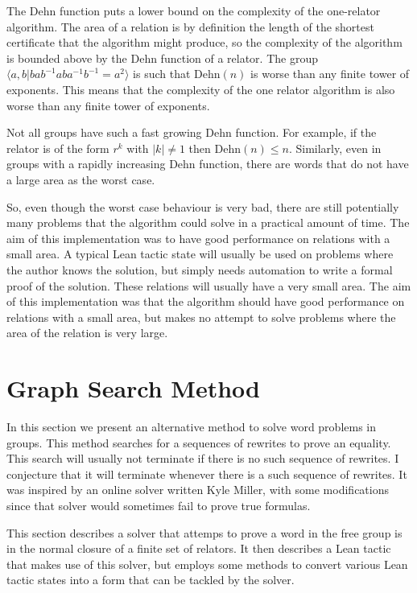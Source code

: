 \documentclass[12pt]{article} %
\theoremstyle{definition}
\theoremstyle{definition}
\theoremstyle{definition}
\theoremstyle{definition}
\theoremstyle{definition}
\theoremstyle{definition}
\begin{document}
  The Dehn function puts a lower bound on the complexity of the one-relator algorithm.
  The area of a relation is by definition the length of the shortest certificate
  that the algorithm might produce, so the complexity of the algorithm is bounded above by
  the Dehn function of a relator.
  The group $\langle a, b | b a b^{-1} a b a^{-1} b^{-1} = a^2\rangle$ is such that
  $\text{Dehn}(n)$ is worse than any finite tower of exponents. This means that the
  complexity of the one relator algorithm is also worse than any finite tower of
  exponents.

  Not all groups have such a fast growing Dehn function. For example, if the relator
  is of the form $r^k$ with $|k| \ne 1$ then $\text{Dehn}(n) \le n$.
  Similarly, even in groups with a rapidly increasing Dehn function,
  there are words that do not have a large area as the worst case.

  So, even though the worst case behaviour is very bad, there are still potentially many
  problems that the algorithm could solve in a practical amount of time. The aim of this
  implementation was to have good performance on relations with a small area.
  A typical Lean tactic state will usually be used on problems where the author knows
  the solution, but simply needs automation to write a formal proof of the solution.
  These relations will usually have a very small area. The aim of this implementation
  was that the algorithm should have good performance on relations with a small area,
  but makes no attempt to solve problems where the area of the relation is very large.

\section{Graph Search Method}\label{gsmethod}

  In this section we present an alternative method to solve word problems in groups.
  This method searches for a sequences of rewrites to prove an equality. This search will
  usually not terminate if there is no such sequence of rewrites. I conjecture that it
  will terminate whenever there is a such sequence of rewrites. It was inspired by an
  online solver written Kyle Miller, with some modifications since that solver
  would sometimes fail to prove true formulas.

  This section describes a solver that attemps to prove a word in the free group
  is in the normal closure of a finite set of relators. It then describes
  a Lean tactic that makes use of this solver, but employs some methods
  to convert various Lean tactic states into a form that can be tackled by
  the solver.
\end{document}
